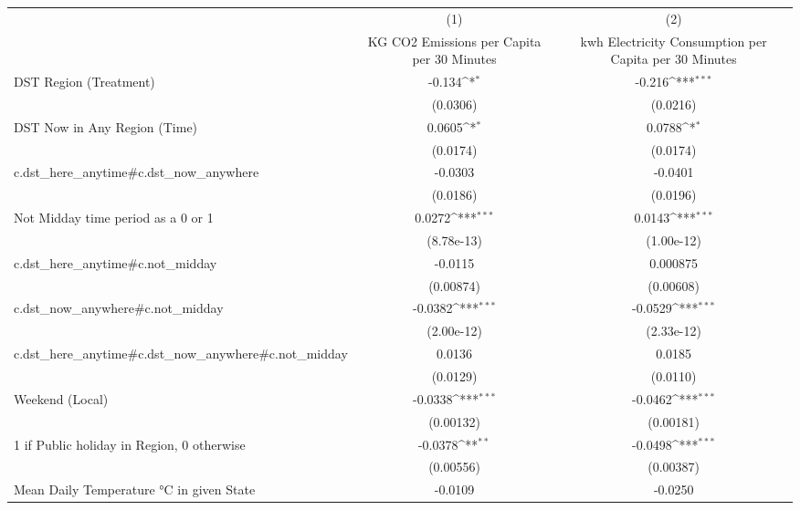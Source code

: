 {
\def\sym#1{\ifmmode^{#1}\else\(^{#1}\)\fi}
\begin{tabular}{l*{2}{c}}
\hline\hline
                    &\multicolumn{1}{c}{(1)}&\multicolumn{1}{c}{(2)}\\
                    &\multicolumn{1}{c}{KG CO2 Emissions per Capita per 30 Minutes}&\multicolumn{1}{c}{kwh Electricity Consumption per Capita per 30 Minutes}\\
\hline
DST Region (Treatment)&      -0.134\sym{*}  &      -0.216\sym{***}\\
                    &    (0.0306)         &    (0.0216)         \\
[1em]
DST Now in Any Region (Time)&      0.0605\sym{*}  &      0.0788\sym{*}  \\
                    &    (0.0174)         &    (0.0174)         \\
[1em]
c.dst\_here\_anytime#c.dst\_now\_anywhere&     -0.0303         &     -0.0401         \\
                    &    (0.0186)         &    (0.0196)         \\
[1em]
Not Midday time period as a 0 or 1&      0.0272\sym{***}&      0.0143\sym{***}\\
                    &  (8.78e-13)         &  (1.00e-12)         \\
[1em]
c.dst\_here\_anytime#c.not\_midday&     -0.0115         &    0.000875         \\
                    &   (0.00874)         &   (0.00608)         \\
[1em]
c.dst\_now\_anywhere#c.not\_midday&     -0.0382\sym{***}&     -0.0529\sym{***}\\
                    &  (2.00e-12)         &  (2.33e-12)         \\
[1em]
c.dst\_here\_anytime#c.dst\_now\_anywhere#c.not\_midday&      0.0136         &      0.0185         \\
                    &    (0.0129)         &    (0.0110)         \\
[1em]
Weekend (Local)     &     -0.0338\sym{***}&     -0.0462\sym{***}\\
                    &   (0.00132)         &   (0.00181)         \\
[1em]
1 if Public holiday in Region, 0 otherwise&     -0.0378\sym{**} &     -0.0498\sym{***}\\
                    &   (0.00556)         &   (0.00387)         \\
[1em]
Mean Daily Temperature °C in given State&     -0.0109         &     -0.0250         \\

\end{tabular}}
